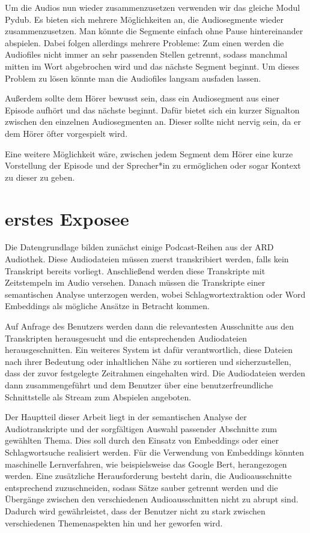 Um die Audios nun wieder zusammenzusetzen verwenden wir das gleiche Modul Pydub. Es bieten sich mehrere Möglichkeiten an, die Audiosegmente wieder zusammenzusetzen. Man könnte die Segmente einfach ohne Pause hintereinander abspielen. Dabei folgen allerdings mehrere Probleme: 
Zum einen werden die Audiofiles nicht immer an sehr passenden Stellen getrennt, sodass manchmal mitten im Wort abgebrochen wird und das nächste Segment beginnt. 
Um dieses Problem zu lösen könnte man die Audiofiles langsam ausfaden lassen.

Außerdem sollte dem Hörer bewusst sein, dass ein Audiosegment aus einer Episode aufhört und das nächste beginnt. Dafür bietet sich ein kurzer Signalton zwischen den einzelnen Audiosegmenten an. Dieser sollte nicht nervig sein, da er dem Hörer öfter vorgespielt wird. 

Eine weitere Möglichkeit wäre, zwischen jedem Segment dem Hörer eine kurze Vorstellung der Episode und der Sprecher*in zu ermöglichen oder sogar Kontext zu dieser zu geben. 


\section{erstes Exposee}

Die Datengrundlage bilden zunächst einige Podcast-Reihen aus der ARD Audiothek. Diese Audiodateien müssen zuerst transkribiert werden, falls kein Transkript bereits vorliegt. Anschließend werden diese Transkripte mit Zeitstempeln im Audio versehen. Danach müssen die Transkripte einer semantischen Analyse unterzogen werden, wobei Schlagwortextraktion oder Word Embeddings als mögliche Ansätze in Betracht kommen.

Auf Anfrage des Benutzers werden dann die relevantesten Ausschnitte aus den Transkripten herausgesucht und die entsprechenden Audiodateien herausgeschnitten. Ein weiteres System ist dafür verantwortlich, diese Dateien nach ihrer Bedeutung oder inhaltlichen Nähe zu sortieren und sicherzustellen, dass der zuvor festgelegte Zeitrahmen eingehalten wird. Die Audiodateien werden dann zusammengeführt und dem Benutzer über eine benutzerfreundliche Schnittstelle als Stream zum Abspielen angeboten.

Der Hauptteil dieser Arbeit liegt in der semantischen Analyse der Audiotranskripte und der sorgfältigen Auswahl passender Abschnitte zum gewählten Thema. Dies soll durch den Einsatz von Embeddings oder einer Schlagwortsuche realisiert werden. Für die Verwendung von Embeddings könnten maschinelle Lernverfahren, wie beispielsweise das Google Bert, herangezogen werden. Eine zusätzliche Herausforderung besteht darin, die Audioausschnitte entsprechend zuzuschneiden, sodass Sätze sauber getrennt werden und die Übergänge zwischen den verschiedenen Audioausschnitten nicht zu abrupt sind. Dadurch wird gewährleistet, dass der Benutzer nicht zu stark zwischen verschiedenen Themenaspekten hin und her geworfen wird.

\cite{barthel}
\cite{choi2018}
\cite{clark2020}
\cite{du2017}
\cite{jones2021}
\cite{kang2012}
~\cite{karpukhin2020}
\cite{laban2022}
\cite{lochrie2018}
\cite{maroni2020}
\cite{moldovan2000}
\cite{zhang2020}
\cite{oord2017}